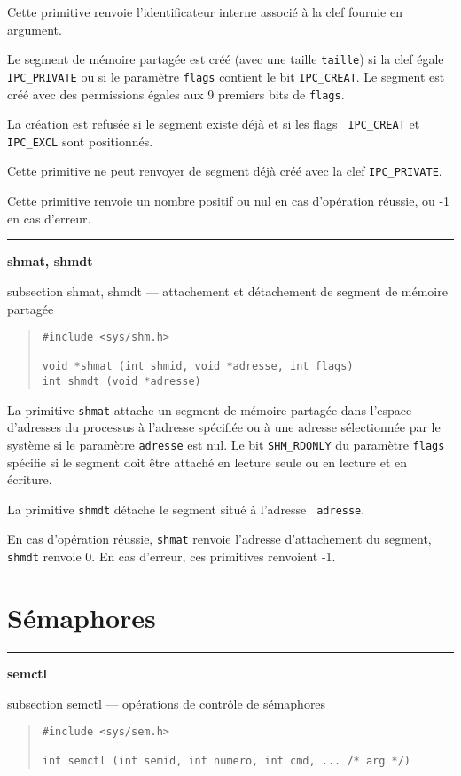\documentclass [twoside] {report}
\newcommand {\primitive} [1]
    {
	{\large \bf #1}
	\addcontentsline {toc} {subsection} {#1}
    }
\newcommand {\separation}
    {
	\vspace {7mm}
	\nopagebreak
	\hrule
    }
\begin{document}
Cette primitive renvoie l'identificateur interne associé à la clef
fournie en argument.

Le segment de mémoire partagée est créé (avec une taille {\tt taille})
si la clef égale {\tt IPC\_PRIVATE} ou si le paramètre {\tt flags}
contient le bit {\tt IPC\_CREAT}.  Le segment est créé avec des
permissions égales aux 9 premiers bits de {\tt flags}.

La création est refusée si le segment existe déjà et si les flags {\tt
IPC\_CREAT} et {\tt IPC\_EXCL} sont positionnés.

Cette primitive ne peut renvoyer de segment déjà créé avec la clef
{\tt IPC\_PRIVATE}.

Cette primitive renvoie un nombre positif ou nul en cas d'opération
réussie, ou -1 en cas d'erreur.


\separation
\primitive {shmat, shmdt} --- attachement et détachement de segment de mémoire partagée

\begin {quote}
\begin {verbatim}
#include <sys/shm.h>

void *shmat (int shmid, void *adresse, int flags)
int shmdt (void *adresse)
\end{verbatim}
\end {quote}

La primitive {\tt shmat} attache un segment de mémoire partagée dans
l'espace d'adresses du processus à l'adresse spécifiée ou à une adresse
sélectionnée par le système si le paramètre {\tt adresse} est nul. Le
bit {\tt SHM\_RDONLY} du paramètre {\tt flags} spécifie si le segment
doit être attaché en lecture seule ou en lecture et en écriture.

La primitive {\tt shmdt} détache le segment situé à l'adresse {\tt
adresse}.

En cas d'opération réussie, {\tt shmat} renvoie l'adresse d'attachement
du segment, {\tt shmdt} renvoie 0.  En cas d'erreur, ces primitives
renvoient -1.


\section* {Sémaphores}

\separation
\primitive {semctl} --- opérations de contrôle de sémaphores

\begin {quote}
\begin {verbatim}
#include <sys/sem.h>

int semctl (int semid, int numero, int cmd, ... /* arg */)
\end{verbatim}
\end {quote}
\end{document}
